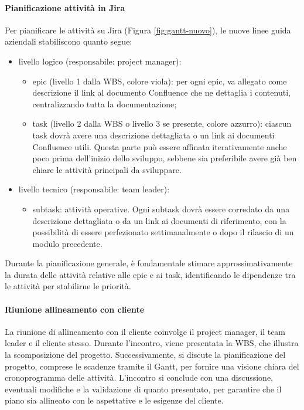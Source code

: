             \paragraph{Pianificazione attività in Jira}
            Per pianificare le attività su Jira (Figura \ref{fig:gantt-nuovo}), le nuove linee guida aziendali stabiliscono quanto segue:
            \begin{itemize}
                \item livello logico (responsabile: project manager):
                \begin{itemize}
                    \item epic (livello 1 dalla \ac{WBS}, colore viola): per ogni epic, va allegato come descrizione il link
                    al documento Confluence che ne dettaglia i contenuti, centralizzando tutta la documentazione;
                    \item task (livello 2 dalla \ac{WBS} o livello 3 se presente, colore azzurro): ciascun task dovrà avere
                    una descrizione dettagliata o un link ai documenti Confluence utili. Questa parte può essere affinata
                    iterativamente anche poco prima dell'inizio dello sviluppo, sebbene sia preferibile avere già ben chiare le attività principali da sviluppare.
                \end{itemize}
                \item livello tecnico (responsabile: team leader):
                \begin{itemize}
                    \item subtask: attività operative. Ogni subtask dovrà essere corredato da una descrizione dettagliata o da un
                    link ai documenti di riferimento, con la possibilità di essere perfezionato settimanalmente o dopo il rilascio di un modulo precedente.
                \end{itemize}
            \end{itemize}

            Durante la pianificazione generale, è fondamentale stimare approssimativamente la durata delle attività relative alle epic e ai task,
            identificando le dipendenze tra le attività per stabilirne le priorità.

            \paragraph{Riunione allineamento con cliente}
            La riunione di allineamento con il cliente coinvolge il project manager, il team leader e il cliente stesso.
            Durante l'incontro, viene presentata la \ac{WBS}, che illustra la scomposizione del progetto. Successivamente,
            si discute la pianificazione del progetto, comprese le scadenze tramite il Gantt, per fornire una visione
            chiara del cronoprogramma delle attività. L'incontro si conclude con una discussione, eventuali modifiche e
            la validazione di quanto presentato, per garantire che il piano sia allineato con le aspettative e le esigenze del cliente.

